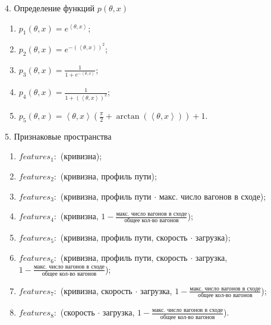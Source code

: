\documentclass[aspectratio=169]{beamer}
\begin{document}
    
    \begin{frame}{4. Определение функций $p(\theta, x)$}
        \begin{enumerate}
            \item $p_1(\theta, x) = e^{\left\langle \theta, x \right\rangle }$;
            \item $p_2(\theta, x) = e^{-(\left\langle\theta, x\right\rangle)^2}$;
            \item $p_3(\theta, x) = \frac{1}{1+e^{-\left\langle\theta, x\right\rangle}}$;
            \item $p_4(\theta, x) = \frac{1}{1 + (\left\langle\theta, x\right\rangle)^2}$;
            \item $p_5(\theta, x) = \left\langle \theta, x\right\rangle (\frac{\pi}{2} + \arctan(\left\langle \theta, x\right\rangle)) + 1$.
        \end{enumerate}
    \end{frame}


    \begin{frame}{5. Признаковые пространства}
        \begin{enumerate}
            \item $features_1:$ (кривизна);
            \item $features_2:$ (кривизна, профиль пути);
            \item $features_3:$ (кривизна, профиль пути $\cdot$ макс. число вагонов в сходе);
            \item $features_4:$ (кривизна, $1 - \frac{\text{макс. число вагонов в сходе}}{\text{общее кол-во вагонов}}$);
            \item $features_5:$ (кривизна, профиль пути, скорость $\cdot$ загрузка);
            \item $features_6:$ (кривизна, профиль пути, скорость $\cdot$ загрузка,\\ $1 - \frac{\text{макс. число вагонов в сходе}}{\text{общее кол-во вагонов}}$);
            \item $features_7:$ (кривизна, скорость $\cdot$ загрузка, $1 - \frac{\text{макс. число вагонов в сходе}}{\text{общее кол-во вагонов}}$);
            \item $features_8:$ (скорость $\cdot$ загрузка, $1 - \frac{\text{макс. число вагонов в сходе}}{\text{общее кол-во вагонов}}$).
            \newline
        \end{enumerate}
    \end{frame}
\end{document}

